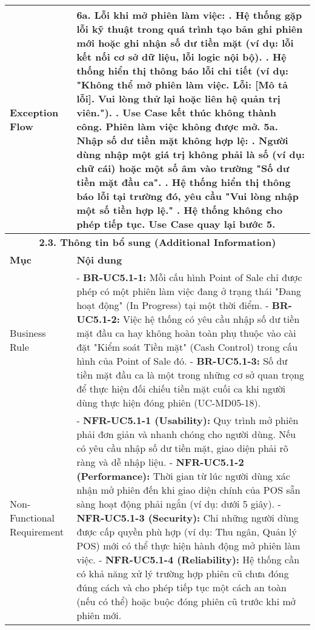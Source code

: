 \begin{longtable}{|m{4cm}|p{11cm}|}
\hline
Exception Flow & \textbf{6a. Lỗi khi mở phiên làm việc:} \newline    1. Hệ thống gặp lỗi kỹ thuật trong quá trình tạo bản ghi phiên mới hoặc ghi nhận số dư tiền mặt (ví dụ: lỗi kết nối cơ sở dữ liệu, lỗi logic nội bộ). \newline    2. Hệ thống hiển thị thông báo lỗi chi tiết (ví dụ: "Không thể mở phiên làm việc. Lỗi: [Mô tả lỗi]. Vui lòng thử lại hoặc liên hệ quản trị viên."). \newline    3. Use Case kết thúc không thành công. Phiên làm việc không được mở. \newline \textbf{5a. Nhập số dư tiền mặt không hợp lệ:} \newline    1. Người dùng nhập một giá trị không phải là số (ví dụ: chữ cái) hoặc một số âm vào trường "Số dư tiền mặt đầu ca". \newline    2. Hệ thống hiển thị thông báo lỗi tại trường đó, yêu cầu "Vui lòng nhập một số tiền hợp lệ." \newline    3. Hệ thống không cho phép tiếp tục. Use Case quay lại bước 5. \\
\hline
\multicolumn{2}{|c|}{\textbf{2.3. Thông tin bổ sung (Additional Information)}} \\
\hline
\textbf{Mục} & \textbf{Nội dung} \\
\hline
Business Rule & - \textbf{BR-UC5.1-1:} Mỗi cấu hình Point of Sale chỉ được phép có một phiên làm việc đang ở trạng thái "Đang hoạt động" (In Progress) tại một thời điểm. \newline - \textbf{BR-UC5.1-2:} Việc hệ thống có yêu cầu nhập số dư tiền mặt đầu ca hay không hoàn toàn phụ thuộc vào cài đặt "Kiểm soát Tiền mặt" (Cash Control) trong cấu hình của Point of Sale đó. \newline - \textbf{BR-UC5.1-3:} Số dư tiền mặt đầu ca là một trong những cơ sở quan trọng để thực hiện đối chiếu tiền mặt cuối ca khi người dùng thực hiện đóng phiên (UC-MD05-18). \\
\hline
Non-Functional Requirement & - \textbf{NFR-UC5.1-1 (Usability):} Quy trình mở phiên phải đơn giản và nhanh chóng cho người dùng. Nếu có yêu cầu nhập số dư tiền mặt, giao diện phải rõ ràng và dễ nhập liệu. \newline - \textbf{NFR-UC5.1-2 (Performance):} Thời gian từ lúc người dùng xác nhận mở phiên đến khi giao diện chính của POS sẵn sàng hoạt động phải ngắn (ví dụ: dưới 5 giây). \newline - \textbf{NFR-UC5.1-3 (Security):} Chỉ những người dùng được cấp quyền phù hợp (ví dụ: Thu ngân, Quản lý POS) mới có thể thực hiện hành động mở phiên làm việc. \newline - \textbf{NFR-UC5.1-4 (Reliability):} Hệ thống cần có khả năng xử lý trường hợp phiên cũ chưa đóng đúng cách và cho phép tiếp tục một cách an toàn (nếu có thể) hoặc buộc đóng phiên cũ trước khi mở phiên mới. \\
\hline
\end{longtable}

